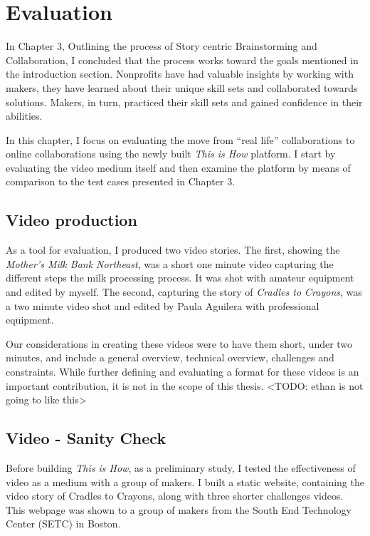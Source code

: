 \chapter{Evaluation}
\label{chap_eval}

In Chapter 3, Outlining the process of Story centric Brainstorming and Collaboration, I concluded that the process works toward the goals mentioned in the introduction section. Nonprofits have had valuable insights by working with makers, they have learned about their unique skill sets and collaborated towards solutions. Makers, in turn, practiced their skill sets and gained confidence in their abilities.

In this chapter, I focus on evaluating the move from ``real life'' collaborations to online collaborations using the newly built \textit{This is How} platform. I start by evaluating the video medium itself and then examine the platform by means of comparison to the test cases presented in Chapter 3.

\section{Video production} As a tool for evaluation, I produced two video stories. The first, showing the \textit{Mother's Milk Bank Northeast}, was a short one minute video capturing the different steps the milk processing process. It was shot with amateur equipment and edited by myself. The second, capturing the story of \textit{Cradles to Crayons}, was a two minute video shot and edited by Paula Aguilera with professional equipment. 

Our considerations in creating these videos were to have them short, under two minutes, and include a general overview, technical overview, challenges and constraints. While further defining and evaluating a format for these videos is an important contribution, it is not in the scope of this thesis. <TODO: ethan is not going to like this>

\section {Video - Sanity Check}

Before building \textit{This is How}, as a preliminary study, I tested the effectiveness of video as a medium with a group of makers. I built a static website, containing the video story of Cradles to Crayons, along with three shorter challenges videos. This webpage was shown to a group of makers from the South End Technology Center (SETC) in Boston.


